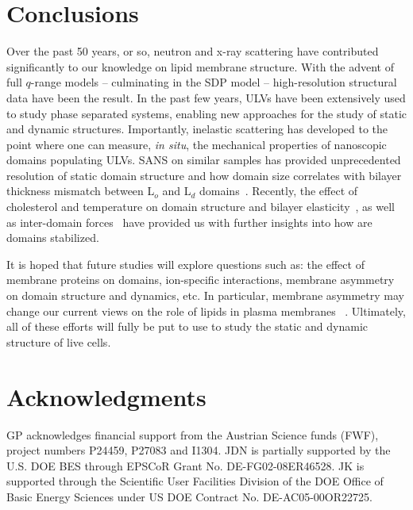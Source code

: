 \documentclass[8.5pt,twoside,twocolumn]{article}
\begin{document}
\section{Conclusions}
Over the past 50 years, or so, neutron and x-ray scattering have contributed significantly to our knowledge on lipid membrane structure. With  the advent of full $q$-range models -- culminating in the SDP model -- high-resolution structural data have been the result. In the past few years, ULVs have been extensively used to study phase separated systems, enabling new approaches for the study of static and dynamic structures. Importantly, inelastic scattering has  developed to the point where one can measure, \textit{in situ}, the mechanical properties of nanoscopic domains populating ULVs. SANS on similar samples has provided unprecedented resolution of static domain structure and how domain size correlates with bilayer thickness mismatch between L$_o$ and L$_d$ domains~\cite{Heberle.2013}. Recently, the effect of cholesterol and temperature on domain structure and bilayer elasticity~\cite{Heftberger.2015b}, as well as inter-domain forces~\cite{Kollmitzer.2015} have provided us with further insights into how are domains stabilized.

It is hoped that future studies will explore questions such as: the effect of membrane proteins on domains, ion-specific interactions, membrane asymmetry on domain structure and dynamics, etc.  In particular, membrane asymmetry may change our current views on the role of lipids in plasma membranes ~\cite{Marquardt.2015}. Ultimately, all of these efforts will fully be put to use to study the static and dynamic structure of live cells.


\section*{Acknowledgments}

GP acknowledges financial support from the Austrian Science funds (FWF), project numbers P24459, P27083 and I1304. JDN is partially supported by the U.S. DOE BES through EPSCoR Grant No. DE-FG02-08ER46528.  JK is supported through the Scientific User Facilities Division of the DOE Office of Basic Energy Sciences under US DOE Contract No. DE-AC05-00OR22725.

\end{document}
